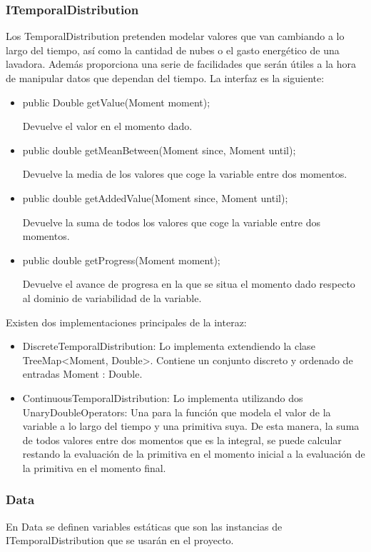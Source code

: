 \documentclass[12pt,a4paper,openright,oneside]{article}
\numberwithin{equation}{section}
\theoremstyle{definition}
\begin{document}
\subsubsection{ITemporalDistribution}
Los TemporalDistribution pretenden modelar valores que van cambiando a lo largo del tiempo, así como la cantidad de nubes o el gasto energético de una lavadora. Además proporciona una serie de facilidades que serán útiles a la hora de manipular datos que dependan del tiempo. La interfaz es la siguiente:
\begin{itemize}
\item public Double getValue(Moment moment);

Devuelve el valor en el momento dado.
\item public double getMeanBetween(Moment since, Moment until);

Devuelve la media de los valores que coge la variable entre dos momentos.
\item public double getAddedValue(Moment since, Moment until);

Devuelve la suma de todos los valores que coge la variable entre dos momentos.
\item public double getProgress(Moment moment);

Devuelve el avance de progresa en la que se situa el momento dado respecto al dominio de variabilidad de la variable.
\end{itemize}
Existen dos implementaciones principales de la interaz: 
\begin{itemize}
\item DiscreteTemporalDistribution: Lo implementa extendiendo la clase TreeMap<Moment, Double>. Contiene un conjunto discreto y ordenado de entradas Moment : Double.  
\item ContinuousTemporalDistribution: Lo implementa utilizando dos UnaryDoubleOperators: Una para la función que modela el valor de la variable a lo largo del tiempo y una primitiva suya. De esta manera, la suma de todos valores entre dos momentos que es la integral, se puede calcular restando la evaluación de la primitiva en el momento inicial a la evaluación de la primitiva en el momento final.
\end{itemize}
\subsubsection{Data}
En Data se definen variables estáticas que son las instancias de ITemporalDistribution que se usarán en el proyecto.
\end{document}
